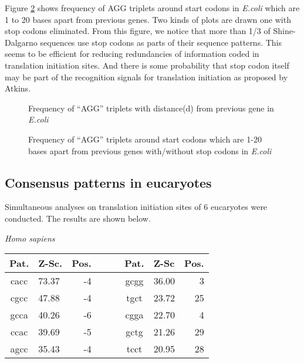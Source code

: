 Figure \ref{ec_agg_stopeli1_20} shows frequency of AGG triplets around
start codons in {\it E.coli} which are 1 to 20 bases apart from previous
genes. Two kinds of plots are drawn one with stop codons
eliminated. From this figure, we notice that more than 1/3 of
Shine-Dalgarno sequences use stop codons as parts of their sequence
patterns. This seems to be efficient for reducing redundancies of
information coded in translation initiation sites. And there is some
probability that stop codon itself may be part of the recognition
signals for translation initiation as proposed by Atkins\cite{label898}.

\begin{figure}
\begin{center}
\end{center}
\caption{Frequency of ``AGG'' triplets with distance(d) from previous gene in {\it E.coli}}
\label{ec_agg_dist}
\end{figure}

\begin{figure}
\begin{center}
\end{center}
\caption{Frequency of ``AGG'' triplets around start codons which are 1-20 bases apart from previous genes with/without stop codons in {\it E.coli}}
\label{ec_agg_stopeli1_20}
\end{figure}


\subsection{Consensus patterns in eucaryotes}

Simultaneous analyses on translation initiation sites of 6 eucaryotes
were conducted. The results are shown below.

\vspace{1em}
\noindent
{\it Homo sapiens}

\noindent
\begin{center}
\begin{tabular}{clrcclr}
Pat. & Z-Sc. & Pos. & \verb+   + & Pat. & Z-Sc & Pos. \\
\hline
cacc & 73.37 & -4 & & gcgg & 36.00 & 3 \\
cgcc & 47.88 & -4 & & tgct & 23.72 & 25 \\
gcca & 40.26 & -6 & & cgga & 22.70 & 4 \\
ccac & 39.69 & -5 & & gctg & 21.26 & 29 \\
agcc & 35.43 & -4 & & tcct & 20.95 & 28 \\
\end{tabular}
\end{center}

